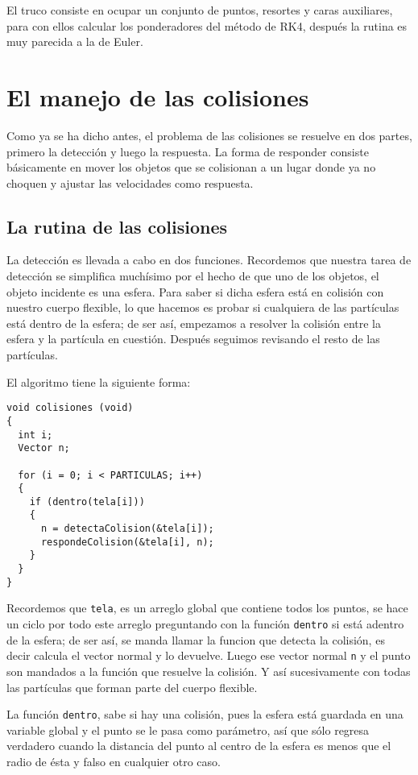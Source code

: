 El truco consiste en ocupar un conjunto de puntos, resortes y caras auxiliares, para con ellos calcular los ponderadores del método de RK4, después la rutina es muy parecida a la de Euler.
\section{El manejo de las colisiones}
Como ya se ha dicho antes, el problema de las colisiones se resuelve en dos partes, primero la detección y luego la respuesta. La forma de responder consiste básicamente en mover los objetos que se colisionan a un lugar donde ya no choquen y ajustar las velocidades como respuesta.
\subsection{La rutina de las colisiones}
La detección es llevada a cabo en dos funciones. Recordemos que nuestra tarea de detección se simplifica muchísimo por el hecho de que uno de los objetos, el objeto incidente es una esfera. Para saber si dicha esfera está en colisión con nuestro cuerpo flexible, lo que hacemos es probar si cualquiera de las partículas está dentro de la esfera; de ser así, empezamos a resolver la colisión entre la esfera y la partícula en cuestión. Después seguimos revisando el resto de las partículas.

El algoritmo tiene la siguiente forma:
\begin{verbatim}
void colisiones (void)
{
  int i;
  Vector n;

  for (i = 0; i < PARTICULAS; i++)
  {
    if (dentro(tela[i]))
    {
      n = detectaColision(&tela[i]);
      respondeColision(&tela[i], n);
    }
  }
}
\end{verbatim}
Recordemos que \verb|tela|, es un arreglo global que contiene todos los puntos, se hace un ciclo por todo este arreglo preguntando con la función \verb|dentro| si está adentro de la esfera; de ser así, se manda llamar la funcion que detecta la colisión, es decir calcula el vector normal y lo devuelve. Luego ese vector normal \verb|n| y el punto son mandados a la función que resuelve la colisión. Y así sucesivamente con todas las partículas que forman parte del cuerpo flexible.

La función \verb|dentro|, sabe si hay una colisión, pues la esfera está guardada en una variable global y el punto se le pasa como parámetro, así que sólo regresa verdadero cuando la distancia del punto al centro de la esfera es menos que el radio de ésta y falso en cualquier otro caso.

